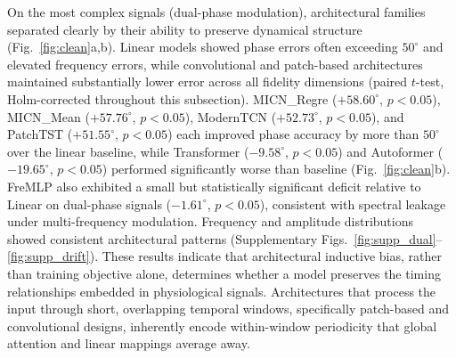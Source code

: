 On the most complex signals (dual-phase modulation), architectural families separated clearly by their ability to preserve dynamical structure (Fig.~\ref{fig:clean}a,b). Linear models showed phase errors often exceeding $50^{\circ}$ and elevated frequency errors, while convolutional and patch-based architectures maintained substantially lower error across all fidelity dimensions (paired $t$-test, Holm-corrected throughout this subsection). MICN\_Regre ($+58.60^{\circ}$, $p < 0.05$), MICN\_Mean ($+57.76^{\circ}$, $p < 0.05$), ModernTCN \cite{luo2024moderntcn} ($+52.73^{\circ}$, $p < 0.05$), and PatchTST ($+51.55^{\circ}$, $p < 0.05$) each improved phase accuracy by more than $50^{\circ}$ over the linear baseline, while Transformer ($-9.58^{\circ}$, $p < 0.05$) and Autoformer \cite{wu2021autoformer} ($-19.65^{\circ}$, $p < 0.05$) performed significantly worse than baseline (Fig.~\ref{fig:clean}b). FreMLP also exhibited a small but statistically significant deficit relative to Linear on dual-phase signals ($-1.61^{\circ}$, $p < 0.05$), consistent with spectral leakage under multi-frequency modulation. Frequency and amplitude distributions showed consistent architectural patterns (Supplementary Figs.~\ref{fig:supp_dual}--\ref{fig:supp_drift}). These results indicate that architectural inductive bias, rather than training objective alone, determines whether a model preserves the timing relationships embedded in physiological signals. Architectures that process the input through short, overlapping temporal windows, specifically patch-based and convolutional designs, inherently encode within-window periodicity that global attention and linear mappings average away.


